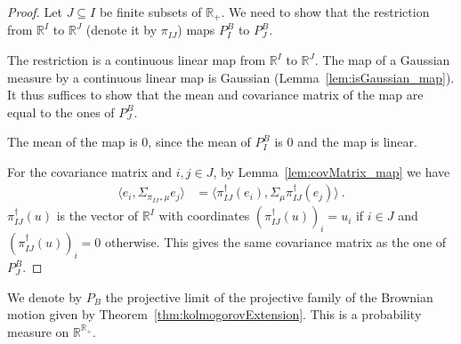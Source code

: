 \begin{proof}
Let $J \subseteq I$ be finite subsets of $\mathbb{R}_+$.
We need to show that the restriction from $\mathbb{R}^I$ to $\mathbb{R}^J$ (denote it by $\pi_{IJ}$) maps $P^B_I$ to $P^B_J$.

The restriction is a continuous linear map from $\mathbb{R}^I$ to $\mathbb{R}^J$.
The map of a Gaussian measure by a continuous linear map is Gaussian (Lemma~\ref{lem:isGaussian_map}).
It thus suffices to show that the mean and covariance matrix of the map are equal to the ones of $P^B_J$.

The mean of the map is $0$, since the mean of $P^B_I$ is $0$ and the map is linear.

For the covariance matrix and $i, j \in J$, by Lemma~\ref{lem:covMatrix_map} we have
\begin{align*}
  \langle e_i, \Sigma_{\pi_{IJ*}\mu} e_j\rangle
  &= \langle \pi_{IJ}^\dagger(e_i), \Sigma_\mu \pi_{IJ}^\dagger(e_j)\rangle
  \: .
\end{align*}
$\pi_{IJ}^\dagger(u)$ is the vector of $\mathbb{R}^I$ with coordinates $(\pi_{IJ}^\dagger(u))_i = u_i$ if $i \in J$ and $(\pi_{IJ}^\dagger(u))_i = 0$ otherwise.
This gives the same covariance matrix as the one of $P^B_J$.
\end{proof}


\begin{definition}\label{def:gaussianLimit}
  \leanok
We denote by $P_B$ the projective limit of the projective family of the Brownian motion given by Theorem~\ref{thm:kolmogorovExtension}.
This is a probability measure on $\mathbb{R}^{\mathbb{R}_+}$.
\end{definition}
